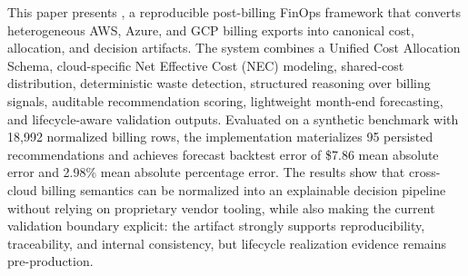 This paper presents \systemname{}, a reproducible post-billing FinOps framework that converts heterogeneous AWS, Azure, and GCP billing exports into canonical cost, allocation, and decision artifacts. The system combines a Unified Cost Allocation Schema, cloud-specific Net Effective Cost (NEC) modeling, shared-cost distribution, deterministic waste detection, structured reasoning over billing signals, auditable recommendation scoring, lightweight month-end forecasting, and lifecycle-aware validation outputs. Evaluated on a synthetic benchmark with 18{,}992 normalized billing rows, the implementation materializes 95 persisted recommendations and achieves forecast backtest error of \$7.86 mean absolute error and 2.98\% mean absolute percentage error. The results show that cross-cloud billing semantics can be normalized into an explainable decision pipeline without relying on proprietary vendor tooling, while also making the current validation boundary explicit: the artifact strongly supports reproducibility, traceability, and internal consistency, but lifecycle realization evidence remains pre-production.
